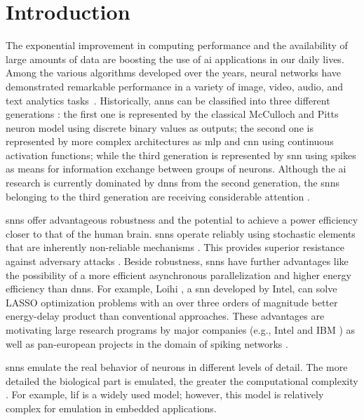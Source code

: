\section{Introduction}
\label{sec:introduction}
The exponential improvement in computing performance and the availability of large amounts of data are boosting the use of \gls{ai} applications in our daily lives. Among the various algorithms developed over the years, neural networks have demonstrated remarkable performance in a variety of image, video, audio, and text analytics tasks~\cite{schmidhuber2015deep,Taigman_2014_CVPR}. Historically, \gls{ann}s can be classified into three different generations \cite{Design_Exploration_SbS_Trans20}: the first one is represented by the classical McCulloch and Pitts neuron model using discrete binary values as outputs; the second one is represented by more complex architectures as \gls{mlp} and \gls{cnn} using continuous activation functions; while the third generation is represented by \gls{snn} using spikes as means for information exchange between groups of neurons. Although the \gls{ai} research is currently dominated by \glspl{dnn} from the second generation, the \glspl{snn} belonging to the third generation are receiving considerable attention \cite{Spinnaker_Trans13,ernst2007efficient,Design_Exploration_SbS_Trans20, SNN_Survey_Trans19}.

\glspl{snn} offer advantageous robustness and the potential to achieve a power efficiency closer to that of the human brain.
\glspl{snn} operate reliably using stochastic elements that are inherently non-reliable mechanisms \cite{mcdonnell2011benefits}.
This provides superior resistance against adversary attacks
\cite{ernst2007efficient, Dapello2020.06.16.154542}. Beside
robustness, \glspl{snn} have further advantages like the possibility of a more efficient asynchronous parallelization and higher
energy efficiency than \glspl{dnn}. For
example, Loihi \cite{davies2018loihi}, a \gls{snn} developed by Intel, can
solve LASSO optimization problems with an over three orders of
magnitude better energy-delay product than conventional
approaches. These advantages are motivating large research programs by
major companies (e.g., Intel \cite{davies2018loihi} and IBM
\cite{TrueNorth_Trans15}) as well as pan-european projects in the
domain of spiking networks \cite{Spinnaker_Trans13}.


\glspl{snn} emulate the real behavior of neurons in different levels of detail. The more detailed the biological part is emulated, the greater the computational complexity \cite{izhikevich2004model,amunts2019human}. For example, \gls{lif} is a widely used model; however, this model is relatively complex for emulation in embedded applications.
	
